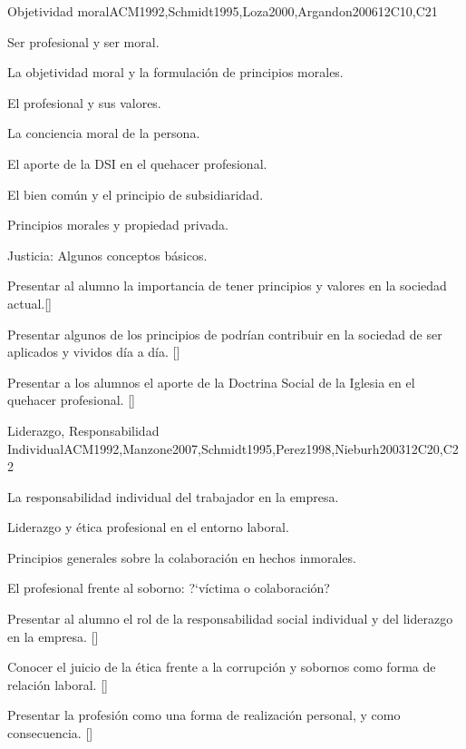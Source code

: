 \begin{syllabus}
\begin{unit}{}{Objetividad moral}{ACM1992,Schmidt1995,Loza2000,Argandon2006}{12}{C10,C21}
\begin{topics}
	\item Ser profesional y ser moral.
	\item La objetividad moral y la formulación de principios morales.
	\item El profesional y sus valores.
	\item La conciencia moral de la persona.
	\item El aporte de la DSI en el quehacer profesional.
	\item El bien común y el principio de subsidiaridad.
	\item Principios morales y propiedad privada.
	\item Justicia: Algunos conceptos básicos.
\end{topics}
\begin{learningoutcomes}
	\item Presentar al alumno la importancia de tener principios y valores en la sociedad actual.[\Usage]
	\item Presentar algunos de los principios de podrían contribuir en la sociedad de ser aplicados y vividos día a día. [\Usage]
	\item Presentar a los alumnos el aporte de la Doctrina Social de la Iglesia en el quehacer profesional. [\Usage]
\end{learningoutcomes}
\end{unit}

\begin{unit}{}{Liderazgo, Responsabilidad Individual}{ACM1992,Manzone2007,Schmidt1995,Perez1998,Nieburh2003}{12}{C20,C22}
\begin{topics}
	\item La responsabilidad individual del trabajador en la empresa.
	\item Liderazgo y ética profesional en el entorno laboral.
	\item Principios generales sobre la colaboración en hechos inmorales.
	\item El profesional frente al soborno: ?`víctima o colaboración?

\end{topics}
\begin{learningoutcomes}
	\item Presentar al alumno el rol de la responsabilidad social individual y del liderazgo en la empresa. [\Familiarity]
	\item Conocer el juicio de la ética frente a la corrupción y sobornos como forma de relación laboral. [\Familiarity]
	\item Presentar la profesión como una forma de realización personal, y como consecuencia. []
\end{learningoutcomes}
\end{unit}


\end{syllabus}
